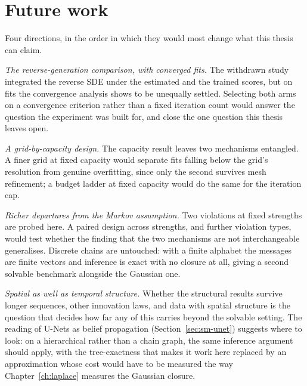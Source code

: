 \section{Future work}

Four directions, in the order in which they would most change what this thesis
can claim.

\emph{The reverse-generation comparison, with converged fits.} The withdrawn
study integrated the reverse SDE under the estimated and the trained scores, but
on fits the convergence analysis shows to be unequally settled. Selecting both
arms on a convergence criterion rather than a fixed iteration count would answer
the question the experiment was built for, and close the one question this
thesis leaves open.

\emph{A grid-by-capacity design.} The capacity result leaves two mechanisms
entangled. A finer grid at fixed capacity would separate fits falling below the
grid's resolution from genuine overfitting, since only the second survives mesh
refinement; a budget ladder at fixed capacity would do the same for the
iteration cap.

\emph{Richer departures from the Markov assumption.} Two violations at fixed
strengths are probed here. A paired design across strengths, and further
violation types, would test whether the finding that the two mechanisms are not
interchangeable generalises. Discrete chains are untouched: with a finite
alphabet the messages are finite vectors and inference is exact with no closure
at all, giving a second solvable benchmark alongside the Gaussian one.

\emph{Spatial as well as temporal structure.} Whether the structural results
survive longer sequences, other innovation laws, and data with spatial
structure is the question that decides how far any of this carries beyond the
solvable setting. The reading of U-Nets as belief propagation
(Section~\ref{sec:sm-unet}) suggests where to look: on a hierarchical rather
than a chain graph, the same inference argument should apply, with the
tree-exactness that makes it work here replaced by an approximation whose cost
would have to be measured the way Chapter~\ref{ch:laplace} measures the
Gaussian closure.
